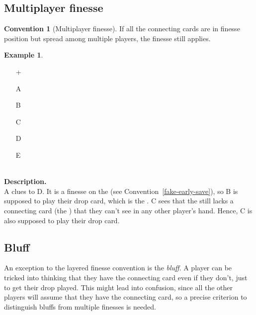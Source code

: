 \documentclass[a4paper]{article}
\theoremstyle{plain}
\theoremstyle{definition}
\newtheorem{example}[theorem]{Example}
\newtheorem{convention}[theorem]{Convention}
\begin{document}
\subsection{Multiplayer finesse}

\begin{convention}[Multiplayer finesse]
	\label{multiplayer-finesse}
	If all the connecting cards are in finesse position but spread among multiple players, the finesse still applies.
\end{convention}

\begin{example} \hfill \\
	\begin{minipage}{0.45\textwidth}
		\begin{itemize}
			\item[\Large +]      
			\item[\Large A]    
			\item[\Large B]    
			\item[\Large C]    
			\item[\Large D]    
			\item[\Large E]    
		\end{itemize}
	\end{minipage}%
	\begin{minipage}{0.55\textwidth}
		\hfill \\
		
		\textbf{Description.} \\
		
		A clues  to D. It is a finesse on the  (see Convention~\ref{fake-early-save}), so B is supposed to play their drop card, which is the . C sees that the  still lacks a connecting card (the ) that they can't see in any other player's hand. Hence, C is also supposed to play their drop card.
	\end{minipage}
\end{example} \vspace{0.15 cm}

\subsection{Bluff}

An exception to the layered finesse convention is the \emph{bluff}. A player can be tricked into thinking that they have the connecting card even if they don't, just to get their drop played. This might lead into confusion, since all the other players will assume that they have the connecting card, so a precise criterion to distinguish bluffs from multiple finesses is needed.
\end{document}
